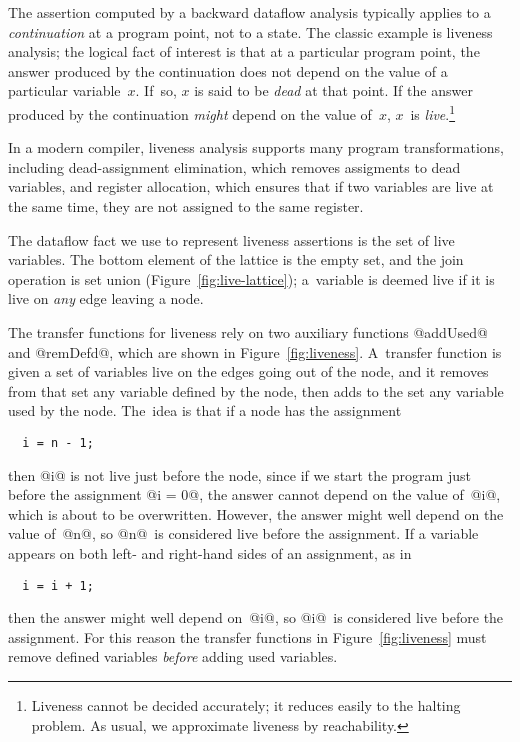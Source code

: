 \documentclass[blockstyle,preprint,nocopyrightspace]{sigplanconf}
\newcommand{\authornote}[1]{{\em #1}}
\def\authornote#1{\unskip\relax}
\newcommand{\simon}[1]{\authornote{SLPJ: #1}}
\newcommand{\john}[1]{\authornote{JD: #1}}
\newcommand\seclabel[1]{\label{sec:#1}}
\newcommand\figref[1]{Figure~\ref{fig:#1}}
\begin{document}
\seclabel{liveness}

The assertion computed by 
a backward dataflow analysis typically applies to a
\emph{continuation} at a program point, not to a state.\john{Why ``typically?''}
The classic example is liveness analysis;
the logical fact of interest is that at a particular program point,
the answer produced by the continuation does not depend on
the value of a particular variable~$x$.
If~so, $x$ is said to be \emph{dead} at that point.
If the answer produced by the continuation \emph{might} depend on the
value of~$x$, $x$~is \emph{live}.\footnote
{Liveness cannot be decided accurately; it reduces easily to the halting problem.
As usual, we approximate liveness by reachability.}

In a modern compiler, liveness analysis supports many program
transformations,
including
dead-assignment elimination,
which removes assigments to dead variables, 
and register allocation, which
ensures that if two variables are 
live at the same time, they are not assigned to the same register. 

The dataflow fact we use to represent liveness assertions is the set of
live variables.
The bottom element of the lattice is the empty set, and the join
operation is set union (\figref{live-lattice});
a~variable is deemed live if it is live on \emph{any} edge leaving a
node. \simon{You mean ``deemed live after the node if it is live on any edge...''.
You don't mean ``deemed live on entry to the node..'' (think of assignments).
It's a bit tricky to state this clearly I grant you.}

The transfer functions for liveness rely on two auxiliary functions
@addUsed@ and @remDefd@, which are shown in \figref{liveness}.
\simon{I suggest that we give more explicit
references into the code, mentioning the functions @middleLiveness@, and 
using @(1)@ etc as URLs. [NR: we want line numbers]  Even then it's a bit confusing becuase we
have last-nodes and liveness, 
both of which start with ``@l@''.  Oh well.}
A~transfer function is given a set of variables live on the edges
going out of the node, and it removes from that set any variable
defined by the node, then adds to the set any variable used by the
node.
The~idea is that if a node has the assignment
\begin{verbatim}
  i = n - 1;
\end{verbatim}
then @i@ is not live just before the node, since if we start the
program just before the assignment @i = 0@, the answer cannot 
depend on the value of~@i@, which is about to be overwritten.
However, the answer might well depend on the value of~@n@, so
@n@~is considered live before the assignment.
If a variable appears on both left- and right-hand sides of an
assignment, as in
\begin{verbatim}
  i = i + 1;
\end{verbatim}
then the answer might well depend on~@i@, so @i@~is considered live
before the assignment.
For this reason the transfer functions in \figref{liveness} must
remove defined variables \emph{before} adding used variables.
\end{document}
